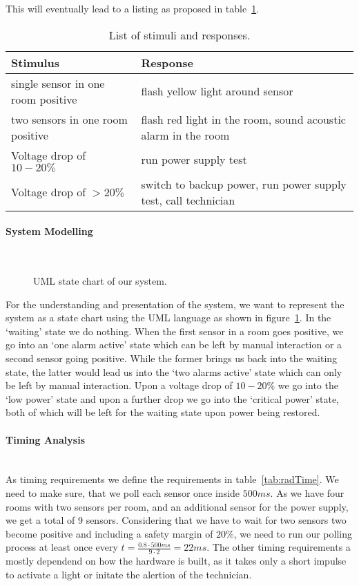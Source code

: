 \documentclass[10pt,a4paper,titlepage,draft]{article} %
\begin{document}
This will eventually lead to a listing as proposed in table~\ref{tab:radWarner}.
\begin{table}[htbp]
\begin{tabular}{|p{4cm}|p{7.2cm}|}
\hline %
\rowcolor{gray} Stimulus & Response \\
\hline %
single sensor in one room positive & flash yellow light around sensor \\
\hline %
two sensors in one room positive & flash red light in the room, sound acoustic alarm in the room\\
\hline %
Voltage drop of $10-20\%$ & run power supply test\\
\hline %
Voltage drop of $>20\%$ & switch to backup power, run power supply test, call technician\\
\hline %
\end{tabular}
\caption{List of stimuli and responses.}
\label{tab:radWarner}
\end{table}

\paragraph{System Modelling}  \ \\
\begin{figure}[htbp]
\centering
\scalebox{.7}{}
\caption{UML state chart of our system.}
\label{fig:radState}
\end{figure}
For the understanding and presentation of the system, we want to represent the system as a state chart using the UML language as shown in figure~\ref{fig:radState}.
In the `waiting' state we do nothing.
When the first sensor in a room goes positive, we go into an `one alarm active' state which can be left by manual interaction or a second sensor going positive.
While the former brings us back into the waiting state, the latter would lead us into the `two alarms active' state which can only be left by manual interaction.
Upon a voltage drop of $10-20\%$ we go into the `low power' state and upon a further drop we go into the `critical power' state, both of which will be left for the waiting state upon power being restored.

\paragraph{Timing Analysis} \ \\
As timing requirements we define the requirements in table~\ref{tab:radTime}.
We need to make sure, that we poll each sensor once inside $500ms$.
As we have four rooms with two sensors per room, and an additional sensor for the power supply, we get a total of 9 sensors.
Considering that we have to wait for two sensors two become positive and including a safety margin of $20\%$, we need to run our polling process at least once every $\displaystyle t=\frac{0.8\cdot500ms}{9\cdot2}=22ms$. The other timing requirements a mostly dependend on how the hardware is built, as it takes only a short impulse to activate a light or initate the alertion of the technician.
\end{document}
